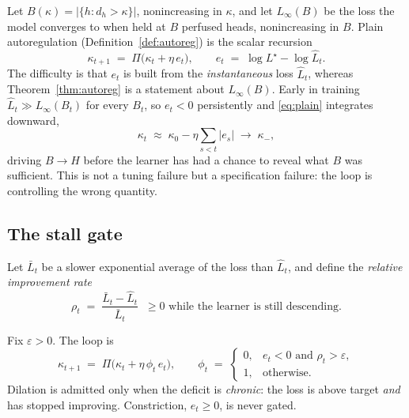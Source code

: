 Let $B(\kappa) = |\{h : d_h > \kappa\}|$, nonincreasing in $\kappa$, and let
$L_\infty(B)$ be the loss the model converges to when held at $B$ perfused heads,
nonincreasing in $B$. Plain autoregulation (Definition~\ref{def:autoreg}) is the scalar
recursion
\begin{equation}
  \label{eq:plain}
  \kappa_{t+1} \;=\; \Pi\bigl(\kappa_t + \eta\,e_t\bigr),
  \qquad e_t \;=\; \log L^\star - \log \widehat{L}_t .
\end{equation}
The difficulty is that $e_t$ is built from the \emph{instantaneous} loss
$\widehat{L}_t$, whereas Theorem~\ref{thm:autoreg} is a statement about
$L_\infty(B)$. Early in training $\widehat{L}_t \gg L_\infty(B_t)$ for every $B_t$, so
$e_t < 0$ persistently and \eqref{eq:plain} integrates downward,
\begin{equation}
  \kappa_t \;\approx\; \kappa_0 - \eta \sum_{s<t} |e_s| \;\longrightarrow\; \kappa_-,
\end{equation}
driving $B \to H$ before the learner has had a chance to reveal what $B$ was
sufficient. This is not a tuning failure but a specification failure: the loop is
controlling the wrong quantity.

\subsection{The stall gate}

Let $\bar{L}_t$ be a slower exponential average of the loss than $\widehat{L}_t$, and
define the \emph{relative improvement rate}
\begin{equation}
  \rho_t \;=\; \frac{\bar{L}_t - \widehat{L}_t}{\bar{L}_t} \;\;\ge 0 \text{ while the
  learner is still descending.}
\end{equation}

\begin{definition}
\label{def:stall}
Fix $\varepsilon > 0$. The loop is
\begin{equation}
  \label{eq:stall}
  \kappa_{t+1} \;=\; \Pi\bigl(\kappa_t + \eta\,\phi_t\, e_t\bigr),
  \qquad
  \phi_t \;=\;
  \begin{cases}
    0, & e_t < 0 \text{ and } \rho_t > \varepsilon,\\
    1, & \text{otherwise.}
  \end{cases}
\end{equation}
Dilation is admitted only when the deficit is \emph{chronic}: the loss is above target
\emph{and} has stopped improving. Constriction, $e_t \ge 0$, is never gated.
\end{definition}

